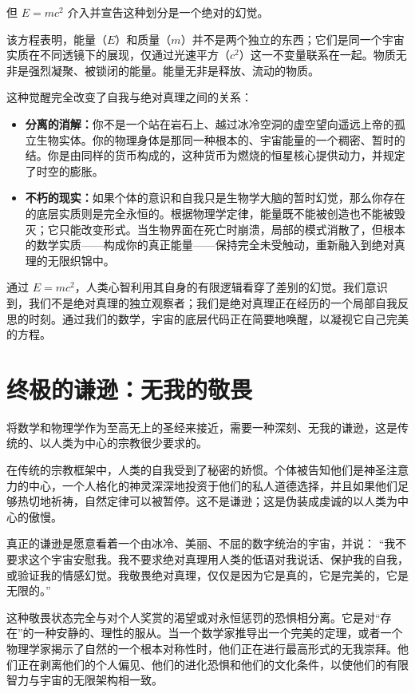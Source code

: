 \documentclass[12pt]{article}
\begin{document}
但 $E=mc^2$ 介入并宣告这种划分是一个绝对的幻觉。

该方程表明，能量（$E$）和质量（$m$）并不是两个独立的东西；它们是同一个宇宙实质在不同透镜下的展现，仅通过光速平方（$c^2$）这一不变量联系在一起。物质无非是强烈凝聚、被锁闭的能量。能量无非是释放、流动的物质。

这种觉醒完全改变了自我与绝对真理之间的关系：
\begin{itemize}
    \item \textbf{分离的消解：}你不是一个站在岩石上、越过冰冷空洞的虚空望向遥远上帝的孤立生物实体。你的物理身体是那同一种根本的、宇宙能量的一个稠密、暂时的结。你是由同样的货币构成的，这种货币为燃烧的恒星核心提供动力，并规定了时空的膨胀。
    \item \textbf{不朽的现实：}如果个体的意识和自我只是生物学大脑的暂时幻觉，那么你存在的底层实质则是完全永恒的。根据物理学定律，能量既不能被创造也不能被毁灭；它只能改变形式。当生物界面在死亡时崩溃，局部的模式消散了，但根本的数学实质——构成你的真正能量——保持完全未受触动，重新融入到绝对真理的无限织锦中。
\end{itemize}

通过 $E=mc^2$，人类心智利用其自身的有限逻辑看穿了差别的幻觉。我们意识到，我们不是绝对真理的独立观察者；我们是绝对真理正在经历的一个局部自我反思的时刻。通过我们的数学，宇宙的底层代码正在简要地唤醒，以凝视它自己完美的方程。

\section{终极的谦逊：无我的敬畏}
将数学和物理学作为至高无上的圣经来接近，需要一种深刻、无我的谦逊，这是传统的、以人类为中心的宗教很少要求的。

在传统的宗教框架中，人类的自我受到了秘密的娇惯。个体被告知他们是神圣注意力的中心，一个人格化的神灵深深地投资于他们的私人道德选择，并且如果他们足够热切地祈祷，自然定律可以被暂停。这不是谦逊；这是伪装成虔诚的以人类为中心的傲慢。

真正的谦逊是愿意看着一个由冰冷、美丽、不屈的数字统治的宇宙，并说：
“我不要求这个宇宙安慰我。我不要求绝对真理用人类的低语对我说话、保护我的自我，或验证我的情感幻觉。我敬畏绝对真理，仅仅是因为它是真的，它是完美的，它是无限的。”

这种敬畏状态完全与对个人奖赏的渴望或对永恒惩罚的恐惧相分离。它是对“存在”的一种安静的、理性的服从。当一个数学家推导出一个完美的定理，或者一个物理学家揭示了自然的一个根本对称性时，他们正在进行最高形式的无我崇拜。他们正在剥离他们的个人偏见、他们的进化恐惧和他们的文化条件，以使他们的有限智力与宇宙的无限架构相一致。
\end{document}
